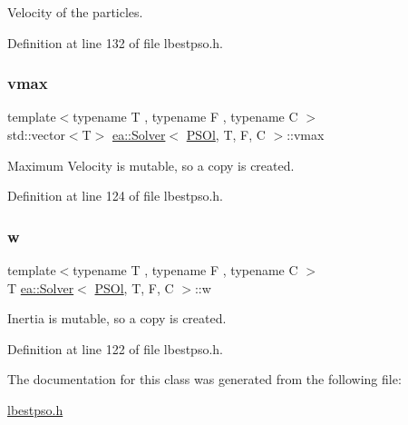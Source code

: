 Velocity of the particles. 



Definition at line 132 of file lbestpso.\+h.

\mbox{\label{classea_1_1_solver_3_01_p_s_ol_00_01_t_00_01_f_00_01_c_01_4_abd93da2229dac4eb2d11f4904a65ae9a}} 
\subsubsection{\texorpdfstring{vmax}{vmax}}
{\footnotesize\ttfamily template$<$typename T , typename F , typename C $>$ \\
std\+::vector$<$T$>$ \hyperlink{classea_1_1_solver}{ea\+::\+Solver}$<$ \hyperlink{structea_1_1_p_s_ol}{P\+S\+Ol}, T, F, C $>$\+::vmax\hspace{0.3cm}{\ttfamily [private]}}



Maximum Velocity is mutable, so a copy is created. 



Definition at line 124 of file lbestpso.\+h.

\mbox{\label{classea_1_1_solver_3_01_p_s_ol_00_01_t_00_01_f_00_01_c_01_4_a5c9d1a207892da92e2cf689b24c256ee}} 
\subsubsection{\texorpdfstring{w}{w}}
{\footnotesize\ttfamily template$<$typename T , typename F , typename C $>$ \\
T \hyperlink{classea_1_1_solver}{ea\+::\+Solver}$<$ \hyperlink{structea_1_1_p_s_ol}{P\+S\+Ol}, T, F, C $>$\+::w\hspace{0.3cm}{\ttfamily [private]}}



Inertia is mutable, so a copy is created. 



Definition at line 122 of file lbestpso.\+h.



The documentation for this class was generated from the following file\+:\begin{DoxyCompactItemize}
\item 
\hyperlink{lbestpso_8h}{lbestpso.\+h}\end{DoxyCompactItemize}
